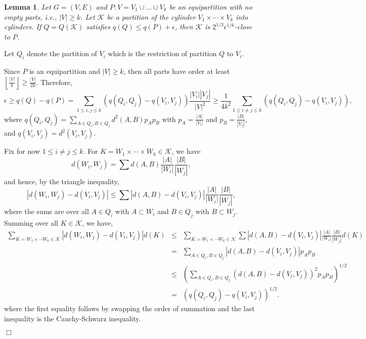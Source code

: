 \documentclass[11pt]{article}
\newtheorem{lemma}{Lemma}[section]
\newenvironment{proof}
      {\medskip\noindent{\bf Proof:}\hspace{1mm}}
      {\hfill$\Box$\medskip}
\begin{document}
\begin{lemma}\label{cylinderclose}
Let $G=(V,E)$ and $P:V=V_1 \cup \ldots \cup V_k$ be an equipartition with no
empty parts, i.e., $|V| \geq k$. Let $\mathcal{K}$ be a partition of the
cylinder $V_1 \times \cdots \times V_k$ into cylinders. If $Q=Q(\mathcal{K})$
satisfies $q(Q) \leq q(P)+\epsilon$, then $\mathcal{K}$ is $2^{1/3}
\epsilon^{1/6}$-close to $P$.
\end{lemma}
\begin{proof}
 Let $Q_i$ denote the partition of $V_i$ which is the restriction of partition
$Q$ to $V_i$.

Since $P$ is an equipartition and $|V| \geq k$, then all parts have order at
least $\left \lfloor \frac{|V|}{k} \right \rfloor \geq \frac{|V|}{2k}$.
Therefore, \begin{equation}\label{QPlow}\epsilon \geq q(Q)-q(P)=\sum_{1 \leq
i,j \leq k}\left(q(Q_i,Q_j)-q(V_i,V_j)\right)\frac{|V_i||V_j|}{|V|^2} \geq
\frac{1}{4k^2}\sum_{1 \leq i \not = j \leq
k}\left(q(Q_i,Q_j)-q(V_i,V_j)\right),\end{equation}
where $q(Q_i,Q_j)=\sum_{A \in Q_i,B \in Q_j}d^2(A,B)p_A p_B$ with $p_A =
\frac{|A|}{|V_i|}$ and $p_B = \frac{|B|}{|V_j|}$, and
$q(V_i,V_j)=d^2(V_i,V_j)$.

Fix for now $1 \leq i \not = j \leq k$. For $K=W_1 \times \cdots \times W_k \in
\mathcal{K}$, we have $$d(W_i,W_j)=\sum
d(A,B)\frac{|A|}{|W_i|}\frac{|B|}{|W_j|},$$
and hence, by the triangle inequality,
$$|d(W_i,W_j)-d(V_i,V_j)| \leq  \sum
|d(A,B)-d(V_i,V_j)|\frac{|A|}{|W_i|}\frac{|B|}{|W_j|},$$
where the sums are over all $A \in Q_i$ with $A \subset W_i$ and $B \in Q_j$
with $B \subset W_j$.
Summing over all $K \in \mathcal{K}$, we have,
\begin{eqnarray*} \sum_{K=W_1 \times \cdots W_k \in \mathcal{K}}
\left|d(W_i,W_j)-d(V_i,V_j)\right|d(K) &  \leq & \sum_{K=W_1 \times \cdots W_k
\in \mathcal{K}} \sum
\left|d(A,B)-d(V_i,V_j)\right|\frac{|A|}{|W_i|}\frac{|B|}{|W_j|}d(K)
\\ & = & \sum_{A \in Q_i,B \in Q_j} \left|d(A,B)-d(V_i,V_j)\right|p_{A}p_{B} \\
& \leq & \left(\sum_{A \in Q_i,B \in Q_j} \left(d(A,B)-d(V_i,V_j)\right)^2
p_{A}p_{B}\right)^{1/2} \\ & = &
\left(q(Q_i,Q_j)-q(V_i,V_j)\right)^{1/2}.\end{eqnarray*}
where the first equality follows by swapping the order of summation and the
last inequality is the Cauchy-Schwarz inequality.



\end{proof}
\end{document}
